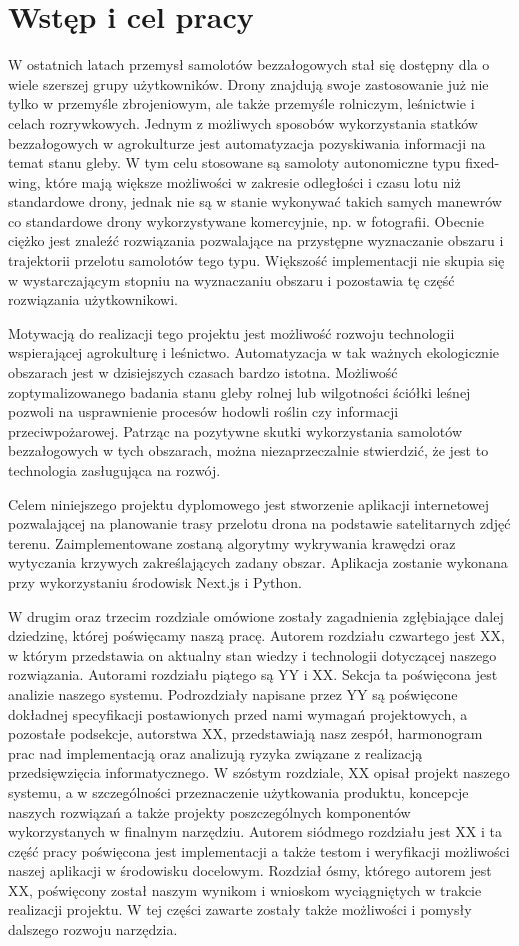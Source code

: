 \chapter{Wstęp i cel pracy}
\label{chap:introduction}
W ostatnich latach przemysł samolotów bezzałogowych stał się dostępny dla o wiele szerszej grupy użytkowników. Drony znajdują swoje zastosowanie już nie tylko w przemyśle zbrojeniowym, ale także przemyśle rolniczym, leśnictwie i celach rozrywkowych. Jednym z możliwych sposobów wykorzystania statków bezzałogowych w agrokulturze jest automatyzacja pozyskiwania informacji na temat stanu gleby. W tym celu stosowane są samoloty autonomiczne typu fixed-wing, które mają większe możliwości w zakresie odległości i czasu lotu niż standardowe drony, jednak nie są w stanie wykonywać takich samych manewrów co standardowe drony wykorzystywane komercyjnie, np. w fotografii. Obecnie ciężko jest znaleźć rozwiązania pozwalające na przystępne wyznaczanie obszaru i trajektorii przelotu samolotów tego typu. Większość implementacji nie skupia się w wystarczającym stopniu na wyznaczaniu obszaru i pozostawia tę część rozwiązania użytkownikowi. 

Motywacją do realizacji tego projektu jest możliwość rozwoju technologii wspierającej agrokulturę i leśnictwo. Automatyzacja w tak ważnych ekologicznie obszarach jest w dzisiejszych czasach bardzo istotna. Możliwość zoptymalizowanego badania stanu gleby rolnej lub wilgotności ściółki leśnej pozwoli na usprawnienie procesów hodowli roślin czy informacji przeciwpożarowej. Patrząc na pozytywne skutki wykorzystania samolotów bezzałogowych w tych obszarach, można niezaprzeczalnie stwierdzić, że jest to technologia zasługująca na rozwój.

Celem niniejszego projektu dyplomowego jest stworzenie aplikacji internetowej pozwalającej na planowanie trasy przelotu drona na podstawie satelitarnych zdjęć terenu. Zaimplementowane zostaną algorytmy wykrywania krawędzi oraz wytyczania krzywych zakreślających zadany obszar. Aplikacja zostanie wykonana przy wykorzystaniu środowisk Next.js i Python.

W drugim oraz trzecim rozdziale omówione zostały zagadnienia zgłębiające dalej dziedzinę, której poświęcamy naszą pracę. Autorem rozdziału czwartego jest XX, w którym przedstawia on aktualny stan wiedzy i technologii dotyczącej naszego rozwiązania. Autorami rozdziału piątego są YY i XX. Sekcja ta poświęcona jest analizie naszego systemu. Podrozdziały napisane przez YY są poświęcone dokładnej specyfikacji postawionych przed nami wymagań projektowych, a pozostałe podsekcje, autorstwa XX, przedstawiają nasz zespół, harmonogram prac nad implementacją oraz analizują ryzyka związane z realizacją przedsięwzięcia informatycznego. W szóstym rozdziale, XX opisał projekt naszego systemu, a w szczególności przeznaczenie użytkowania produktu, koncepcje naszych rozwiązań a także projekty poszczególnych komponentów wykorzystanych w finalnym narzędziu. Autorem siódmego rozdziału jest XX i ta część pracy poświęcona jest implementacji a także testom i weryfikacji możliwości naszej aplikacji w środowisku docelowym. Rozdział ósmy, którego autorem jest XX, poświęcony został naszym wynikom i wnioskom wyciągniętych w trakcie realizacji projektu. W tej części zawarte zostały także możliwości i pomysły dalszego rozwoju narzędzia. 